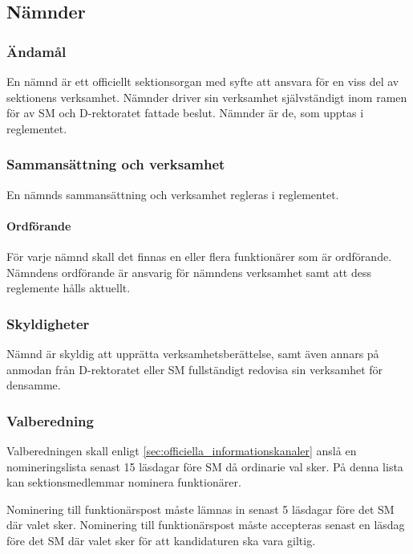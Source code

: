 \documentclass{dgovdoc}
\begin{document}
\subsection{Nämnder}
\label{sec:namnder}

\subsubsection{Ändamål}

En nämnd är ett officiellt sektionsorgan med syfte att ansvara för en viss del
av sektionens verksamhet. Nämnder driver sin verksamhet självständigt inom
ramen för av SM och D-rektoratet fattade beslut. Nämnder är de, som upptas i
reglementet.

\subsubsection{Sammansättning och verksamhet}

En nämnds sammansättning och verksamhet regleras i reglementet.

\paragraph{Ordförande}

För varje nämnd skall det finnas en eller flera funktionärer som är ordförande.
Nämndens ordförande är ansvarig för nämndens verksamhet samt att dess
reglemente hålls aktuellt.

\subsubsection{Skyldigheter}

Nämnd är skyldig att upprätta verksamhetsberättelse, samt även annars på
anmodan från D-rektoratet eller SM fullständigt redovisa sin verksamhet för
densamme.

\subsubsection{Valberedning}

Valberedningen skall enligt \ref{sec:officiella_informationskanaler} anslå en
nomineringslista senast 15 läsdagar före SM då ordinarie val sker. På denna
lista kan sektionsmedlemmar nominera funktionärer.

Nominering till funktionärspost måste lämnas in senast 5 läsdagar före det SM
där valet sker. Nominering till funktionärspost måste accepteras senast en
läsdag före det SM där valet sker för att kandidaturen ska vara giltig.
\end{document}
